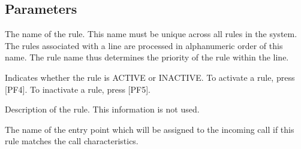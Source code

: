 \documentclass[letterpaper,10pt,english]{sphinxmanual}
\begin{document}
\ignorespaces 

\subsection{Parameters}
\label{\detokenize{connectivity_guide:index-96}}\label{\detokenize{connectivity_guide:id49}}\begin{description}
\sphinxAtStartPar
The name of the rule. This name must be unique across all rules in the system. The rules associated with a line are processed in alphanumeric order of this name. The rule name thus determines the priority of the rule within the line.

\sphinxAtStartPar
Indicates whether the rule is ACTIVE or INACTIVE. To activate a rule, press {[}PF4{]}. To inactivate a rule, press {[}PF5{]}.

\sphinxAtStartPar
Description of the rule. This information is not used.

\sphinxAtStartPar
The name of the entry point which will be assigned to the incoming call if this rule matches the call characteristics.

\end{description}
\end{document}
